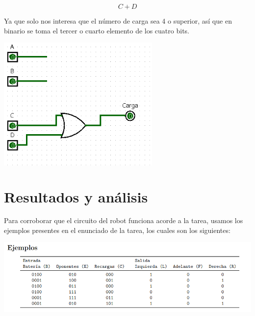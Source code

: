 \documentclass[a4paper]{article}
\begin{document}
\begin{equation}
    C + D 
    \label{eq:ej_ecuacion} %
\end{equation}

Ya que solo nos interesa que el número de carga sea 4 o superior, así que en binario se toma el tercer o cuarto elemento de los cuatro bits.


\begin{center}
    \includegraphics[width=0.6\textwidth]{tarea-1-bat.png} %
\end{center}

\section{Resultados y análisis}
Para corroborar que el circuito del robot funciona acorde a la tarea, usamos los ejemplos presentes en el enunciado de la tarea, los cuales son los siguientes:

\begin{center}
    \includegraphics[width=1\textwidth]{tarea-1-ej.png} %
\end{center}
\end{document}
